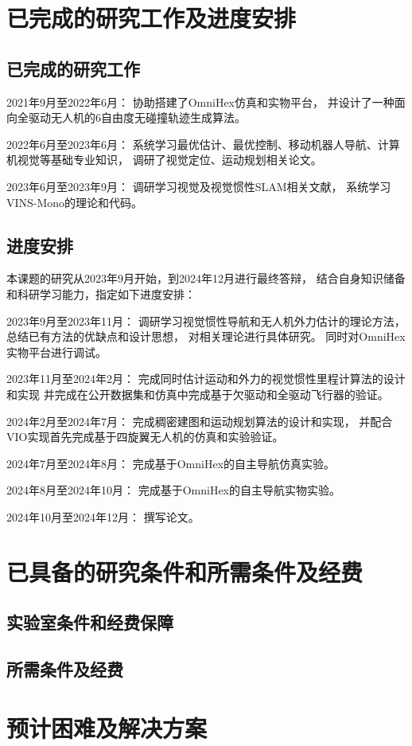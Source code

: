 \section{已完成的研究工作及进度安排}
\subsection{已完成的研究工作}
2021年9月至2022年6月：
协助搭建了OmniHex仿真和实物平台，
并设计了一种面向全驱动无人机的6自由度无碰撞轨迹生成算法。

2022年6月至2023年6月：
系统学习最优估计、最优控制、移动机器人导航、计算机视觉等基础专业知识，
调研了视觉定位、运动规划相关论文。

2023年6月至2023年9月：
调研学习视觉及视觉惯性SLAM相关文献，
系统学习VINS-Mono的理论和代码。

\subsection{进度安排}
本课题的研究从2023年9月开始，到2024年12月进行最终答辩，
结合自身知识储备和科研学习能力，指定如下进度安排：

2023年9月至2023年11月：
调研学习视觉惯性导航和无人机外力估计的理论方法，
总结已有方法的优缺点和设计思想，
对相关理论进行具体研究。
同时对OmniHex实物平台进行调试。

2023年11月至2024年2月：
完成同时估计运动和外力的视觉惯性里程计算法的设计和实现
并完成在公开数据集和仿真中完成基于欠驱动和全驱动飞行器的验证。

2024年2月至2024年7月：
完成稠密建图和运动规划算法的设计和实现，
并配合VIO实现首先完成基于四旋翼无人机的仿真和实验验证。

2024年7月至2024年8月：
完成基于OmniHex的自主导航仿真实验。

2024年8月至2024年10月：
完成基于OmniHex的自主导航实物实验。

2024年10月至2024年12月：
撰写论文。

\section{已具备的研究条件和所需条件及经费}
\subsection{实验室条件和经费保障}

\subsection{所需条件及经费}

\section{预计困难及解决方案}




